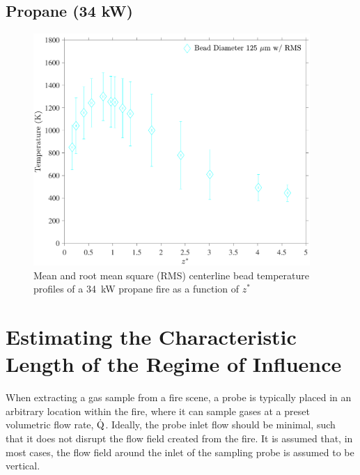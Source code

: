 \documentclass[12pt]{article}
\begin{document}
\pagebreak

\subsection{Propane (34 kW)}
\label{ssec:Propane34KW_Bead_Temp}
\begin{figure}[!h]
	\centering
\includegraphics[width=10.5cm,keepaspectratio]{Propane 34KW_Bead_Temperature.pdf}
	\caption[Mean and RMS centerline bead temperature profile of a 34~kW propane fire]{Mean and root mean square (RMS) centerline bead temperature profiles of a 34~kW propane fire as a function of $z^*$}
	\label{fig:Propane34KW_Bead_Temp}
\end{figure}

\pagebreak

\section{Estimating the Characteristic Length of the Regime of Influence}\label{sec:Regime_of_Influence}

When extracting a gas sample from a fire scene, a probe is typically placed in an arbitrary location within the fire, where it can sample gases at a preset volumetric flow rate, $\rm{\dot{Q}}$. Ideally, the probe inlet flow should be minimal, such that it does not disrupt the flow field created from the fire. It is assumed that, in most cases, the flow field around the inlet of the sampling probe is assumed to be vertical.
\end{document}
